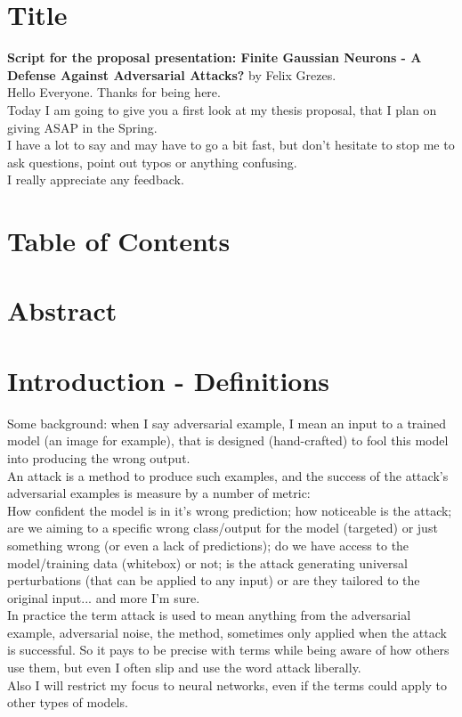 \documentclass{article}
\begin{document}

\section{Title}
\textbf{Script for the proposal presentation: Finite Gaussian Neurons - A Defense Against Adversarial Attacks?} by Felix Grezes.\\

Hello Everyone. Thanks for being here.\\
Today I am going to give you a first look at my thesis proposal, that I plan on giving ASAP in the Spring.\\
I have a lot to say and may have to go a bit fast, but don't hesitate to stop me to ask questions, point out typos or anything confusing.\\
I really appreciate any feedback.

\section{Table of Contents}

\section{Abstract}

\section{Introduction - Definitions}
Some background: when I say adversarial example, I mean
an input to a trained model (an image for example), that is designed (hand-crafted) to fool this model into producing the wrong output.\\
An attack is a method to produce such examples, and the success of the attack's adversarial examples is measure by a number of metric:\\
How confident the model is in it's wrong prediction; how noticeable is the attack; are we aiming to a specific wrong class/output for the model (targeted) or just something wrong (or even a lack of predictions); do we have access to the model/training data (whitebox) or not; is the attack generating universal perturbations (that can be applied to any input) or are they tailored to the original input... and more I'm sure.\\
In practice the term attack is used to mean anything from the adversarial example, adversarial noise, the method, sometimes only applied when the attack is successful. So it pays to be precise with terms while being aware of how others use them, but even I often slip and use the word attack liberally.\\
Also I will restrict my focus to neural networks, even if the terms could apply to other types of models.
\end{document}

